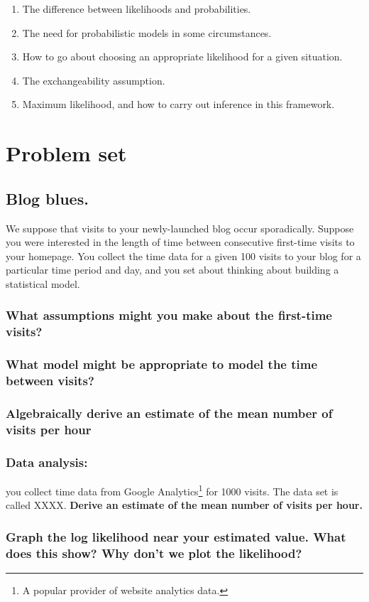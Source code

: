 \documentclass[11pt,fullpage]{book}
\begin{document}
\begin{enumerate}
\item The difference between likelihoods and probabilities.
\item The need for probabilistic models in some circumstances.
\item How to go about choosing an appropriate likelihood for a given situation.
\item The exchangeability assumption.
\item Maximum likelihood, and how to carry out inference in this framework.
\end{enumerate}

\section{Problem set}
\subsection{Blog blues.}
We suppose that visits to your newly-launched blog occur sporadically. Suppose you were interested in the length of time between consecutive first-time visits to your homepage. You collect the time data for a given 100 visits to your blog for a particular time period and day, and you set about thinking about building a statistical model.
\subsubsection{What assumptions might you make about the first-time visits?}
\subsubsection{What model might be appropriate to model the time between visits?}
\subsubsection{Algebraically derive an estimate of the mean number of visits per hour}
\subsubsection{Data analysis:} you collect time data from Google Analytics\footnote{A popular provider of website analytics data.} for 1000 visits. The data set is called XXXX. \textbf{Derive an estimate of the mean number of visits per hour.}
\subsubsection{Graph the log likelihood near your estimated value. What does this show? Why don't we plot the likelihood?}
\end{document}
